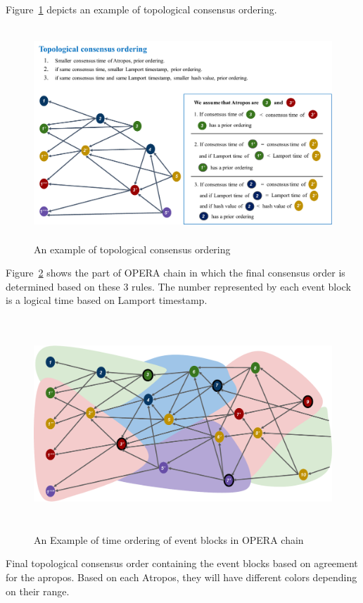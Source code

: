 \documentclass[preprint,12pt]{elsarticle}
\begin{document}
Figure~\ref{fig:topological consensus ordering} depicts an example of topological consensus ordering.
\begin{figure} \centering  
	\includegraphics[height=8cm, width=1.0\columnwidth]{topological_consensus_ordering.pdf}
	\caption{An example of topological consensus ordering}
	\label{fig:topological consensus ordering}
\end{figure}

Figure~\ref{fig:sequence of operachain} shows the part of OPERA chain in which the final consensus order is determined based on these 3 rules. The number represented by each event block is a logical time based on Lamport timestamp.

\begin{figure} [H] \centering  
	\includegraphics[height=8cm, width=1.0\columnwidth]{sequence_operachain}
	\caption{An Example of time ordering of event blocks in OPERA chain}
	\label{fig:sequence of operachain}
\end{figure}

Final topological consensus order containing the event blocks based on agreement for the apropos. Based on each Atropos, they will have different colors depending on their range.
\end{document}
